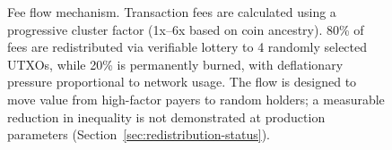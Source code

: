 \begin{figure}[ht]
\caption{Fee flow mechanism. Transaction fees are calculated using a progressive
cluster factor (1x--6x based on coin ancestry). 80\% of fees are redistributed
via verifiable lottery to 4 randomly selected UTXOs, while 20\% is permanently
burned, with deflationary pressure proportional to network usage. The flow is
designed to move value from high-factor payers to random holders; a measurable
reduction in inequality is not demonstrated at production parameters
(Section~\ref{sec:redistribution-status}).}
\label{fig:fee-flow}
\end{figure}
